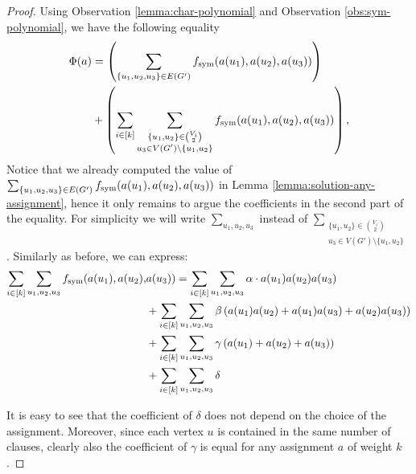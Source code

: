 \documentclass[a4paper,UKenglish,cleveref, autoref, thm-restate,numberwithinsect]{lipics-v2021}
\newcommand{\fsym}{f_{\rm sym}}
\begin{document}
\begin{proof}
    Using Observation \ref{lemma:char-polynomial} and Observation \ref{obs:sym-polynomial}, we have the following equality
        \begin{align*}
            \Phi(a) &= \left(\sum_{\{u_1,u_2,u_3\}\in E(G')} \fsym(a(u_1),a(u_2),a(u_3))\right) \\
            &+ \left( \sum_{i\in[k]}\sum_{\substack{\{u_1,u_2\}\in \binom{V_i}{2}\\u_3\in V(G')\setminus\{u_1,u_2\} }} \fsym(a(u_1),a(u_2),a(u_3))\right),
        \end{align*}
        Notice that we already computed the value of $\sum_{\{u_1,u_2,u_3\}\in E(G')} \fsym(a(u_1),a(u_2),a(u_3))$ in Lemma \ref{lemma:solution-any-assignment}, hence it only remains to argue the coefficients in the second part of the equality.
        For simplicity we will write $\sum_{u_1,u_2,u_3}$ instead of $\sum_{\substack{\{u_1,u_2\}\in \binom{V_i}{2}\\u_3\in V(G')\setminus\{u_1,u_2\} }}$.
        Similarly as before, we can express:
        \begin{align*}
            \sum_{i\in[k]}\sum_{u_1, u_2, u_3} \fsym(a(u_1),a(u_2),&a(u_3)) = \sum_{i\in[k]}\sum_{u_1, u_2, u_3} \alpha \cdot a(u_1)a(u_2)a(u_3) 
                        \\ &+ \sum_{i\in[k]}\sum_{u_1, u_2, u_3}\beta \left(a(u_1)a(u_2)+a(u_1)a(u_3)+a(u_2)a(u_3)\right) 
                        \\ & + \sum_{i\in[k]}\sum_{u_1, u_2, u_3}  \gamma\left(a(u_1)+a(u_2)+a(u_3)\right) 
                        \\ & + \sum_{i\in[k]}\sum_{u_1, u_2, u_3} \delta
        \end{align*}
        
        It is easy to see that the coefficient of $\delta$ does not depend on the choice of the assignment. Moreover, since each vertex $u$ is contained in the same number of clauses, clearly also the coefficient of $\gamma$ is equal for any assignment $a$ of weight $k$.
        

\end{proof}
\end{document}
